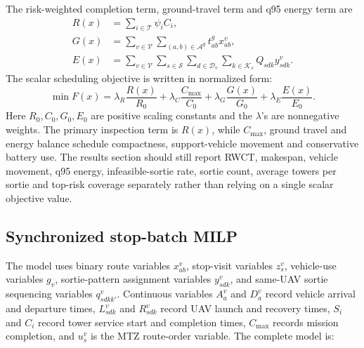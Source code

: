 The risk-weighted completion term, ground-travel term and q95 energy term are
\begin{align}
R(x)&=\sum_{i\in\mathcal{T}}\psi_i C_i,
\label{eq:sb-rwct}\\
G(x)&=\sum_{v\in\mathcal{V}}\sum_{(a,b)\in\mathcal{A}^g}t^g_{ab}x^v_{ab},
\label{eq:sb-ground-term}\\
E(x)&=\sum_{v\in\mathcal{V}}\sum_{s\in\mathcal{S}}
\sum_{d\in\mathcal{D}_v}\sum_{k\in\mathcal{K}_s}Q_{sdk}y^v_{sdk}.
\label{eq:sb-energy-term}
\end{align}
The scalar scheduling objective is written in normalized form:
\begin{equation}
\min F(x)=
\lambda_R\frac{R(x)}{R_0}
+\lambda_C\frac{C_{\max}}{C_0}
+\lambda_G\frac{G(x)}{G_0}
+\lambda_E\frac{E(x)}{E_0}.
\label{eq:objective}
\end{equation}
Here \(R_0,C_0,G_0,E_0\) are positive scaling constants and the \(\lambda\)'s are nonnegative weights. The primary inspection term is \(R(x)\), while \(C_{\max}\), ground travel and energy balance schedule compactness, support-vehicle movement and conservative battery use. The results section should still report RWCT, makespan, vehicle movement, q95 energy, infeasible-sortie rate, sortie count, average towers per sortie and top-risk coverage separately rather than relying on a single scalar objective value.

\subsection{Synchronized stop-batch MILP}
\label{sec:model-milp}

The model uses binary route variables \(x^v_{ab}\), stop-visit variables \(z^v_s\), vehicle-use variables \(g_v\), sortie-pattern assignment variables \(y^v_{sdk}\), and same-UAV sortie sequencing variables \(q^v_{sdkk'}\). Continuous variables \(A^v_a\) and \(D^v_a\) record vehicle arrival and departure times, \(L^v_{sdk}\) and \(R^v_{sdk}\) record UAV launch and recovery times, \(S_i\) and \(C_i\) record tower service start and completion times, \(C_{\max}\) records mission completion, and \(u^v_s\) is the MTZ route-order variable. The complete model is:

